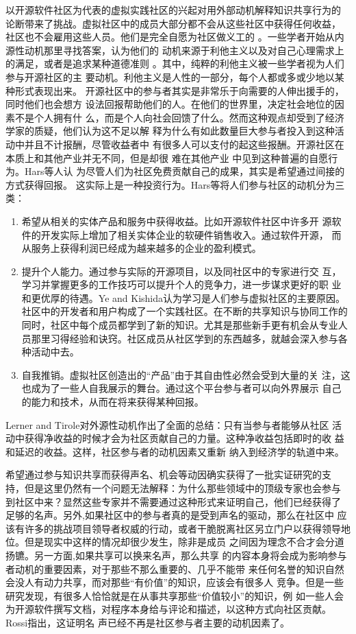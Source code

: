 \documentclass[12pt,a4paper]{ctexart}
\begin{document}
以开源软件社区为代表的虚拟实践社区的兴起对用外部动机解释知识共享行为的
论断带来了挑战。虚拟社区中的成员大部分都不会从这些社区中获得任何收益，
社区也不会雇用这些人员。他们是完全自愿为社区做义工的
\cite{lerner2002sse}。一些学者开始从内源性动机那里寻找答案，认为他们的
动机来源于利他主义以及对自己心理需求上的满足，或者是追求某种道德准则
\cite{Wu2007}。其中，纯粹的利他主义被一些学者视为人们参与开源社区的主
要动机。利他主义是人性的一部分，每个人都或多或少地以某种形式表现出来。
开源社区中的参与者其实是非常乐于向需要的人伸出援手的，同时他们也会想方
设法回报帮助他们的人。在他们的世界里，决定社会地位的因素不是个人拥有什
么，而是个人向社会回馈了什么\cite{raymond1999cab}。然而这种观点却受到了经济学家的质疑，他们认为这不足以解
释为什么有如此数量巨大参与者投入到这种活动中并且不计报酬，尽管收益者中
有很多人可以支付的起这些报酬。开源社区在本质上和其他产业并无不同，但是却很
难在其他产业 中见到这种普遍的自愿行为\cite{schmidt2002pso}。Hars等人认
为尽管人们为社区免费贡献自己的成果，其实是希望通过间接的方式获得回报。
这实际上是一种投资行为\cite{hars2002wfm}。Hars等将人们参与社区的动机分为三类：
\begin{enumerate}
\item  希望从相关的实体产品和服务中获得收益。比如开源软件社区中许多开
  源软件的开发实际上增加了相关实体企业的软硬件销售收入。通过软件开源，
  而从服务上获得利润已经成为越来越多的企业的盈利模式。
\item 提升个人能力。通过参与实际的开源项目，以及同社区中的专家进行交
  互，学习并掌握更多的工作技巧可以提升个人的竞争力，进一步谋求更好的职
  业和更优厚的待遇。Ye and Kishida认为学习是人们参与虚拟社区的主要原因。
  社区中的开发者和用户构成了一个实践社区。在不断的共享知识与协同工作的
  同时，社区中每个成员都学到了新的知识。尤其是那些新手更有机会从专业人
  员那里习得经验和诀窍。社区成员从社区学到的东西越多，就越会深入参与各
  种活动中去\cite{1201220}。
\item 自我推销。虚拟社区创造出的“产品”由于其自由性必然会受到大量的关
  注，这也成为了一些人自我展示的舞台。通过这个平台参与者可以向外界展示
  自己的能力和技术，从而在将来获得某种回报。
\end{enumerate}
Lerner and Tirole对外源性动机作出了全面的总结：只有当参与者能够从社区
活动中获得净收益的时候才会为社区贡献自己的力量。这种净收益包括即时的收
益和延迟的收益\cite{lerner2002sse}。这样，社区参与者的动机因素又重新
纳入到经济学的轨道中来。

希望通过参与知识共享而获得声名、机会等动因确实获得了一批实证研究的支
持，但是这里仍然有一个问题无法解释：为什么那些领域中的顶级专家也会参与
到社区中来？显然这些专家并不需要通过这种形式来证明自己，他们已经获得了
足够的名声。另外,如果社区中的参与者真的是受到声名的驱动，那么在社区中
应该有许多的挑战项目领导者权威的行动，或者干脆脱离社区另立门户以获得领导地
位\cite{WeberWeberSteven}。但是现实中这样的情况却很少发生，除非是成员
之间因为理念不合才会分道扬镳。另一方面,如果共享可以换来名声，那么共享
的内容本身将会成为影响参与者动机的重要因素，对于那些不那么重要的、几乎不能带
来任何名誉的知识自然会没人有动力共享，而对那些“有价值”的知识，应该会有很多人
竞争。但是一些研究发现，有很多人恰恰就是在从事共享那些“价值较小”的知识，例
如一些人会为开源软件撰写文档，对程序本身给与评论和描述，以这种方式向社区贡献。Rossi指出，这证明名
声已经不再是社区参与者主要的动机因素了\cite{Rossi2004}。
\end{document}

